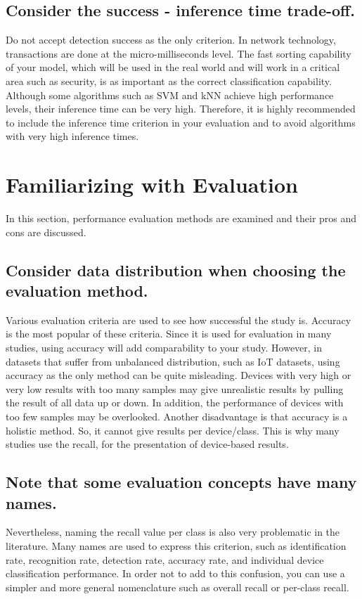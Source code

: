 \documentclass[journal]{IEEEtran}
\begin{document}
\subsection{Consider the success - inference time trade-off.}
Do not accept detection success as the only criterion. In network technology, transactions are done at the micro-milliseconds level. The fast sorting capability of your model, which will be used in the real world and will work in a critical area such as security, is as important as the correct classification capability. Although some algorithms such as SVM and kNN achieve high performance levels, their inference time can be very high. Therefore, it is highly recommended to include the inference time criterion in your evaluation and to avoid algorithms with very high inference times.



\section{Familiarizing with Evaluation}\label{section:Evaluation}
In this section, performance evaluation methods are examined and their pros and cons are discussed.


\subsection{Consider data distribution when choosing the evaluation method.}
Various evaluation criteria are used to see how successful the study is. Accuracy is the most popular of these criteria. Since it is used for evaluation in many studies, using accuracy will add comparability to your study. However, in datasets that suffer from unbalanced distribution, such as IoT datasets, using accuracy as the only method can be quite misleading. Devices with very high or very low results with too many samples may give unrealistic results by pulling the result of all data up or down. In addition, the performance of devices with too few samples may be overlooked. Another disadvantage is that accuracy is a holistic method. So, it cannot give results per device/class. This is why many studies use the recall, for the presentation of device-based results.


\subsection{Note that some evaluation concepts have many names.}
Nevertheless, naming the recall value per class is also very problematic in the literature. Many names are used to express this criterion, such as identification rate, recognition rate, detection rate, accuracy rate, and individual device classification performance. In order not to add to this confusion, you can use a simpler and more general nomenclature such as overall recall or per-class recall. 
\end{document}
